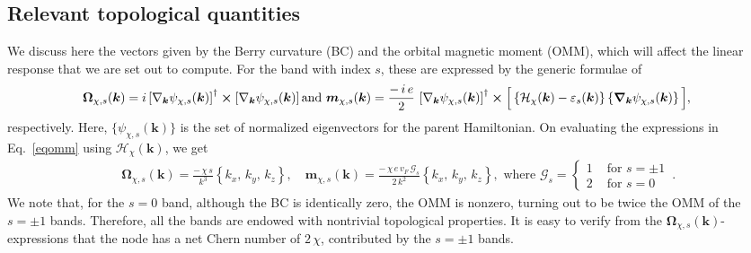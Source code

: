 \documentclass[aps,prb,onecolumn,nofootinbib,citeautoscript,10pt]{revtex4-2}
\begin{document}
\subsection{Relevant topological quantities}

We discuss here the vectors given by the Berry curvature (BC) and the orbital magnetic moment (OMM), which will affect the linear response that we are set out to compute. For the band with index $s$, these are expressed by the generic formulae of \cite{xiao_review,xiao07_valley}
\begin{align} 
\label{eqomm}
& {\boldsymbol \Omega}_{ \chi, s }( \boldsymbol k)  = 
    i  \left[ \nabla_{ \boldsymbol k}  \psi_{ \chi, s }({ \boldsymbol k}) \right ]^\dagger 
    \cross  \left [ \nabla_{ \boldsymbol k}  \psi_{ \chi, s }({ \boldsymbol k}) \right ]
\text{and } 
{\boldsymbol {m}}_{ \chi, s } ( \boldsymbol k) = 
\frac{  -\,i \, e} {2 } \,
 \left[ \nabla_{ \boldsymbol k} \psi_{ \chi, s } ({ \boldsymbol k}) \right ]^\dagger 
 \cross
\Big [
\left \lbrace \mathcal{H}_\chi({ \boldsymbol k}) -\varepsilon_ s
({ \boldsymbol k}) 
\right \rbrace
\left \lbrace \boldsymbol \nabla_{ \boldsymbol k} \psi_{ \chi, s }({ \boldsymbol k})
 \right \rbrace \Big  ] ,
\end{align}
respectively. Here, $ \lbrace   \psi_{ \chi, s }({ \boldsymbol k})  \rbrace $ is the set of normalized eigenvectors for the parent Hamiltonian. On evaluating the expressions in Eq.~\eqref{eqomm} using  $\mathcal{H}_\chi ( \boldsymbol k)$, we get
\begin{align}
& \boldsymbol \Omega_{\chi,s} ({ \boldsymbol k}) = 
 \frac{ -\, \chi \, s  } { k^3 }
 \left \lbrace k_x, \, k_y, \,  k_z \right \rbrace , \quad
 {\boldsymbol {m}}_{\chi, s} ({ \boldsymbol k}) 
=   \frac{ -\, \chi \, e\, v_F \, \mathcal{G}_s} {2 \, k^2 } 
 \left \lbrace k_x, \, k_y, \,  k_z \right \rbrace,
 \text{ where } 
 \mathcal{G}_ s =\begin{cases}
 1 & \text{ for } s=\pm 1 \\
 2 & \text{ for } s=0
 \end{cases} \, .
\end{align}
We note that, for the $s=0$ band, although the BC is identically zero, the OMM is nonzero, turning out to be twice the OMM of the $s =\pm1 $ bands. Therefore, all the bands are endowed with nontrivial topological properties.
It is easy to verify from the $\boldsymbol \Omega_{\chi, s} ({ \boldsymbol k})$-expressions that the node has a net Chern number of $2\, \chi $, contributed by the $s =\pm 1$ bands. 
\end{document}
